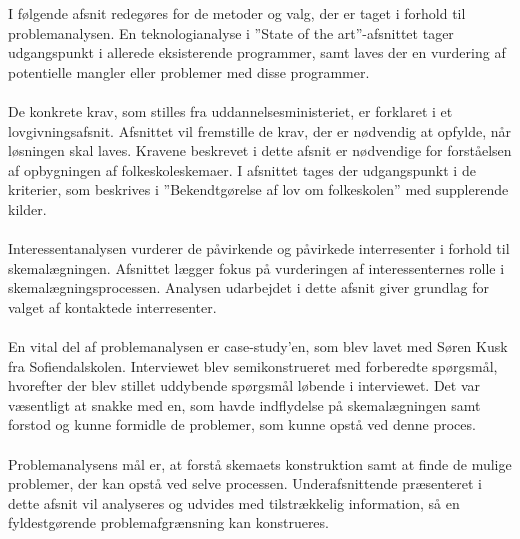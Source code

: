 I følgende afsnit redegøres for de metoder og valg, der er taget i forhold til problemanalysen. En teknologianalyse i ”State of the art”-afsnittet tager udgangspunkt i allerede eksisterende programmer, samt laves der en vurdering af potentielle mangler eller problemer med disse programmer.
\\\\
De konkrete krav, som stilles fra uddannelsesministeriet, er forklaret i et lovgivningsafsnit. Afsnittet vil fremstille de krav, der er nødvendig at opfylde, når løsningen skal laves. Kravene beskrevet i dette afsnit er nødvendige for forståelsen af opbygningen af folkeskoleskemaer. I afsnittet tages der udgangspunkt i de kriterier, som beskrives i ”Bekendtgørelse af lov om folkeskolen” med supplerende kilder.
\\\\
Interessentanalysen vurderer de påvirkende og påvirkede interresenter i forhold til skemalægningen. Afsnittet lægger fokus på vurderingen af interessenternes rolle i skemalægningsprocessen. Analysen udarbejdet i dette afsnit giver grundlag for valget af kontaktede interresenter.
\\\\
En vital del af problemanalysen er case-study’en, som blev lavet med Søren Kusk fra Sofiendalskolen. Interviewet blev semikonstrueret med forberedte spørgsmål, hvorefter der blev stillet uddybende spørgsmål løbende i interviewet. Det var væsentligt at snakke med en, som havde indflydelse på skemalægningen samt forstod og kunne formidle de problemer, som kunne opstå ved denne proces.
\\\\
Problemanalysens mål er, at forstå skemaets konstruktion samt at finde de mulige problemer, der kan opstå ved selve processen. Underafsnittende præsenteret i dette afsnit vil analyseres og udvides med tilstrækkelig information, så en fyldestgørende problemafgrænsning kan konstrueres. 
